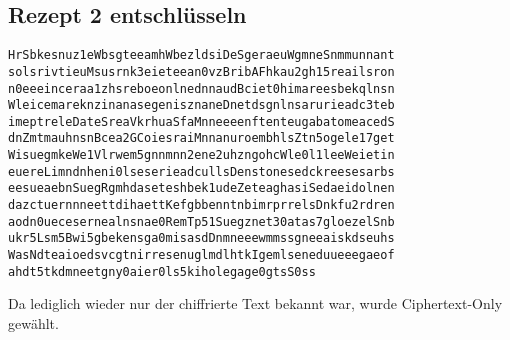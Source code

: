 \subsection{Rezept 2 entschlüsseln}
\label{RezeptZweiEntschluesseln}

{\tiny
\begin{lstlisting}[caption={Das verschlüsselte 2. Rezept: Rezept2NR.txt},
 linewidth=\textwidth,
 breaklines, breakatwhitespace=false]
HrSbkesnuz1eWbsgteeamhWbezldsiDeSgeraeuWgmneSnmmunnant
solsrivtieuMsusrnk3eieteean0vzBribAFhkau2gh15reailsron
n0eeeinceraa1zhsreboeonlnednnaudBciet0himareesbekqlnsn
WleicemareknzinanasegenisznaneDnetdsgnlnsarurieadc3teb
imeptreleDateSreaVkrhuaSfaMnneeeenftenteugabatomeacedS
dnZmtmauhnsnBcea2GCoiesraiMnnanuroembhlsZtn5ogele17get
WisuegmkeWe1Vlrwem5gnnmnn2ene2uhzngohcWle0l1leeWeietin
euereLimndnheni0lseserieadcullsDenstonesedckreesesarbs
eesueaebnSuegRgmhdaseteshbek1udeZeteaghasiSedaeidolnen
dazctuernnneettdihaettKefgbbenntnbimrprrelsDnkfu2rdren
aodn0uecesernealnsnae0RemTp51Suegznet30atas7gloezelSnb
ukr5Lsm5Bwi5gbekensga0misasdDnmneeewmmssgneeaiskdseuhs
WasNdteaioedsvcgtnirresenuglmdlhtkIgemlseneduueeegaeof
ahdt5tkdmneetgny0aier0ls5kiholegage0gtsS0ss
\end{lstlisting}
}

Da lediglich wieder nur der chiffrierte Text bekannt war, wurde Ciphertext-Only
gewählt.

